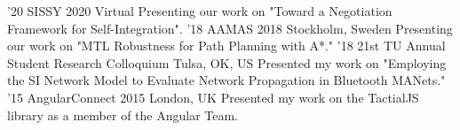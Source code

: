 \documentclass[print]{friggeri-cv}
\begin{document}
    \begin{entrylist}
      \entry
        {'20}
        {SISSY 2020}
        {Virtual}
        {Presenting our work on "Toward a Negotiation Framework for Self-Integration".}
      \entry
        {'18}
        {AAMAS 2018}
        {Stockholm, Sweden}
        {Presenting our work on "MTL Robustness for Path Planning with A*."}
      \entry
        {'18}
        {21st TU Annual Student Research Colloquium}
        {Tulsa, OK, US}
        {Presented my work on "Employing the SI Network Model to Evaluate Network Propagation in Bluetooth MANets."}
      \entry
        {'15}
        {AngularConnect 2015}
        {London, UK}
        {Presented my work on the TactialJS library as a member of the Angular Team.}
    \end{entrylist}
\end{document}
